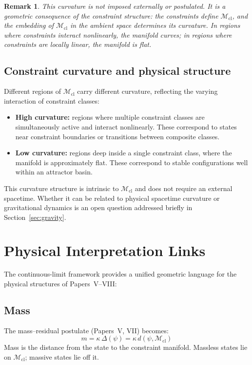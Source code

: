 \documentclass[12pt]{article}
\newtheorem{remark}[theorem]{Remark}
\newcommand{\Mcl}{\mathcal{M}_{\mathrm{cl}}}
\begin{document}
\begin{remark}
This curvature is not imposed externally or postulated. It is a geometric consequence of the constraint structure: the constraints define $\Mcl$, and the embedding of $\Mcl$ in the ambient space determines its curvature. In regions where constraints interact nonlinearly, the manifold curves; in regions where constraints are locally linear, the manifold is flat.
\end{remark}

\subsection{Constraint curvature and physical structure}

Different regions of $\Mcl$ carry different curvature, reflecting the varying interaction of constraint classes:
\begin{itemize}
    \item \textbf{High curvature:} regions where multiple constraint classes are simultaneously active and interact nonlinearly. These correspond to states near constraint boundaries or transitions between composite classes.
    \item \textbf{Low curvature:} regions deep inside a single constraint class, where the manifold is approximately flat. These correspond to stable configurations well within an attractor basin.
\end{itemize}

This curvature structure is intrinsic to $\Mcl$ and does not require an external spacetime. Whether it can be related to physical spacetime curvature or gravitational dynamics is an open question addressed briefly in Section~\ref{sec:gravity}.

\section{Physical Interpretation Links}\label{sec:physics}

The continuous-limit framework provides a unified geometric language for the physical structures of Papers~V--VIII:

\subsection{Mass}

The mass--residual postulate (Papers~V, VII) becomes:
\begin{equation}
    m = \kappa\, \Delta(\psi) = \kappa\, d(\psi, \Mcl)
\end{equation}
Mass is the distance from the state to the constraint manifold. Massless states lie on $\Mcl$; massive states lie off it.
\end{document}
